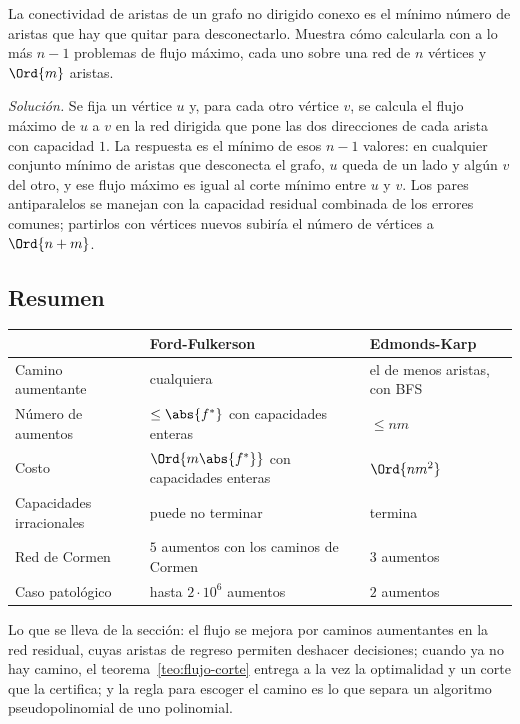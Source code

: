 \documentclass[11pt,letterpaper]{article}
\begin{document}
\begin{ejercicio}
  La conectividad de aristas de un grafo no dirigido conexo es el
  mínimo número de aristas que hay que quitar para desconectarlo.
  Muestra cómo calcularla con a lo más $n - 1$ problemas de flujo
  máximo, cada uno sobre una red de $n$ vértices y $\Ord{m}$ aristas.

  \textit{Solución.} Se fija un vértice $u$ y, para cada otro vértice
  $v$, se calcula el flujo máximo de $u$ a $v$ en la red dirigida que
  pone las dos direcciones de cada arista con capacidad $1$. La
  respuesta es el mínimo de esos $n - 1$ valores: en cualquier
  conjunto mínimo de aristas que desconecta el grafo, $u$ queda de un
  lado y algún $v$ del otro, y ese flujo máximo es igual al corte
  mínimo entre $u$ y $v$. Los pares antiparalelos se manejan con la
  capacidad residual combinada de los errores comunes; partirlos con
  vértices nuevos subiría el número de vértices a $\Ord{n + m}$.
\end{ejercicio}


\subsection*{Resumen}

\begin{center}
\small
\begin{tabular}{lll}
  \toprule
  & \textbf{Ford-Fulkerson} & \textbf{Edmonds-Karp} \\
  \midrule
  Camino aumentante & cualquiera & el de menos aristas, con BFS \\
  Número de aumentos & $\le \abs{f^*}$ con capacidades enteras
    & $\le nm$ \\
  Costo & $\Ord{m \abs{f^*}}$ con capacidades enteras
    & $\Ord{n m^2}$ \\
  Capacidades irracionales & puede no terminar & termina \\
  Red de Cormen & $5$ aumentos con los caminos de Cormen
    & $3$ aumentos \\
  Caso patológico & hasta $2 \cdot 10^6$ aumentos & $2$ aumentos \\
  \bottomrule
\end{tabular}
\end{center}

Lo que se lleva de la sección: el flujo se mejora por caminos
aumentantes en la red residual, cuyas aristas de regreso permiten
deshacer decisiones; cuando ya no hay camino, el
teorema~\ref{teo:flujo-corte} entrega a la vez la optimalidad y un
corte que la certifica; y la regla para escoger el camino es lo que
separa un algoritmo pseudopolinomial de uno polinomial.
\end{document}
